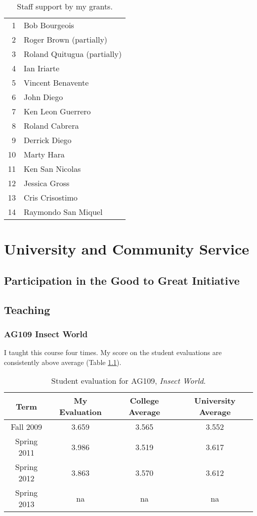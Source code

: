 \documentclass[12pt,oneside,english]{scrbook}
\begin{document}
\pagebreak{}

\begin{longtable}{r>{\raggedright}p{5cm}}
\caption{\label{tab:Staff-support-by-my-grants}Staff support by my grants.}
\tabularnewline
\endfirsthead
\midrule 
1 &
 Bob Bourgeois\tabularnewline
2 &
 Roger Brown (partially)\tabularnewline
3 &
 Roland Quitugua (partially)\tabularnewline
4 &
 Ian Iriarte\tabularnewline
5 &
 Vincent Benavente\tabularnewline
6 &
 John Diego\tabularnewline
7 &
 Ken Leon Guerrero\tabularnewline
8 &
 Roland Cabrera\tabularnewline
9 &
 Derrick Diego\tabularnewline
10 &
 Marty Hara\tabularnewline
11 &
 Ken San Nicolas\tabularnewline
12 &
 Jessica Gross\tabularnewline
13 &
Cris Crisostimo\tabularnewline
14 &
Raymondo San Miquel\tabularnewline
\bottomrule
\end{longtable}

\chapter{University and Community Service}

\section{Participation in the Good to Great Initiative}

\section{Teaching }

\subsection{AG109 Insect World}

I taught this course four times. My score on the student evaluations
are consistently above average (Table \ref{tab:Student-evaluation}).

\begin{table}[h]
\protect\caption{\label{tab:Student-evaluation}Student evaluation for AG109, \emph{Insect
World}.}

\centering{}%
\begin{tabular}{cccc}
\hline 
Term &
My Evaluation &
College Average &
University Average\tabularnewline
\hline 
Fall 2009 &
3.659 &
3.565 &
3.552\tabularnewline
Spring 2011 &
3.986 &
3.519 &
3.617\tabularnewline
Spring 2012 &
3.863 &
3.570 &
3.612\tabularnewline
Spring 2013 &
na &
na &
na\tabularnewline
\hline 
\end{tabular}
\end{table}
\end{document}
